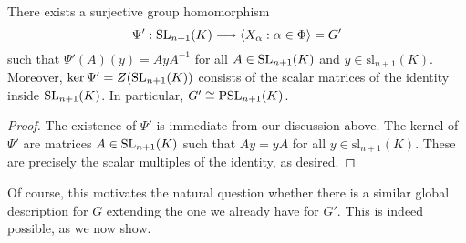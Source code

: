 \begin{proposition}
    There exists a surjective group homomorphism 
    $$\Psi':\mathrm{SL}_{n+1}(K)\longrightarrow\langle X_\alpha:\alpha\in\Phi\rangle=G'$$
    such that $\Psi'(A)(y)=AyA^{-1}$ for all $A\in\mathrm{SL}_{n+1}(K)$ and $y\in\mathrm{sl}_{n+1}(K)$. Moreover, $\ker\Psi'=Z(\mathrm{SL}_{n+1}(K))$ consists of the scalar matrices of the identity inside $\mathrm{SL}_{n+1}(K)$. In particular, $G'\cong\mathrm{PSL}_{n+1}(K)$.
\end{proposition}
\begin{proof}
    The existence of $\Psi'$ is immediate from our discussion above. The kernel of $\Psi'$ are matrices $A\in\mathrm{SL}_{n+1}(K)$ such that $Ay=yA$ for all $y\in\mathrm{sl}_{n+1}(K)$. These are precisely the scalar multiples of the identity, as desired.
\end{proof}


Of course, this motivates the natural question whether there is a similar global description for $G$ extending the one we already have for $G'$. This is indeed possible, as we now show.

